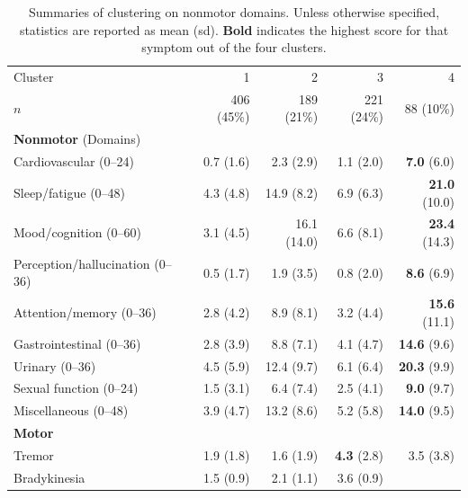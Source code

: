 \documentclass[preprint,3p,twocolumn]{elsarticle} %
\begin{document}
\begin{table}[t]
  \centering
  \caption{Summaries of clustering on nonmotor domains. Unless otherwise specified, statistics are
    reported as mean (sd). \textbf{Bold} indicates the highest score for that symptom out of the
  four clusters.}
  \label{tab:nmd}
  \begin{threeparttable}
  \begin{tabular}{l r r r r}
    \toprule
    Cluster & 1 & 2 & 3 & 4 \\
    $n$ & 406 (45\%) & 189 (21\%) & 221 (24\%) & 88 (10\%) \\
    \midrule
    \textbf{Nonmotor} (Domains) & & & & \\
    Cardiovascular (0--24) & 0.7 (1.6)\tnote{24} & 2.3 (2.9)\tnote{134} & 1.1 (2.0)\tnote{24} &
    \textbf{7.0} (6.0)\tnote{234} \\
    Sleep/fatigue (0--48) & 4.3 (4.8)\tnote{234} & 14.9 (8.2)\tnote{134} & 6.9 (6.3)\tnote{124}
    & \textbf{21.0} (10.0)\tnote{123} \\
    Mood/cognition (0--60) & 3.1 (4.5)\tnote{234} & 16.1 (14.0)\tnote{134} & 6.6
    (8.1)\tnote{124} & \textbf{23.4} (14.3)\tnote{123} \\
    Perception/hallucination (0--36) & 0.5 (1.7)\tnote{24} & 1.9 (3.5)\tnote{134} & 0.8
    (2.0)\tnote{24} & \textbf{8.6} (6.9)\tnote{123} \\
    Attention/memory (0--36) & 2.8 (4.2)\tnote{24} & 8.9 (8.1)\tnote{134} & 3.2 (4.4)\tnote{24} &
    \textbf{15.6} (11.1)\tnote{123} \\
    Gastrointestinal (0--36) & 2.8 (3.9)\tnote{234} & 8.8 (7.1)\tnote{134} & 4.1
    (4.7)\tnote{124} & \textbf{14.6} (9.6)\tnote{123} \\
    Urinary (0--36) & 4.5 (5.9)\tnote{234} & 12.4 (9.7)\tnote{134} & 6.1 (6.4)\tnote{124} &
    \textbf{20.3} (9.9)\tnote{123} \\
    Sexual function (0--24) & 1.5 (3.1)\tnote{24} & 6.4 (7.4)\tnote{134} & 2.5 (4.1)\tnote{24} &
    \textbf{9.0} (9.7)\tnote{123} \\
    Miscellaneous (0--48) & 3.9 (4.7)\tnote{24} & 13.2 (8.6)\tnote{13} & 5.2 (5.8)\tnote{24} &
    \textbf{14.0} (9.5)\tnote{13} \\
    \midrule
    \textbf{Motor} & & & & \\
    Tremor & 1.9 (1.8)\tnote{34} & 1.6 (1.9)\tnote{34} & \textbf{4.3} (2.8)\tnote{124} & 3.5
    (3.8)\tnote{123} \\
    Bradykinesia & 1.5 (0.9)\tnote{234} & 2.1 (1.1)\tnote{134} & 3.6 (0.9)\tnote{124} &

\end{tabular}
\end{threeparttable}
\end{table}
\end{document}
